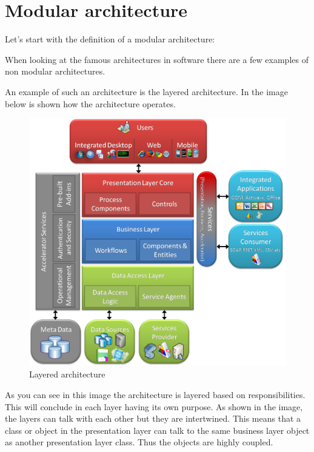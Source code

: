 \chapter{Modular architecture}
\label{sec:ModularArchitecture}

Let's start with the definition of a modular architecture:

When looking at the famous architectures in software there are a few examples of non
modular architectures.

An example of such an architecture is the layered architecture. In the image below is shown how the architecture operates.

\begin{figure}[H]
	\includegraphics[width=\linewidth]{layered_architecture.png}
	\caption{Layered architecture \cite{layeredArchitecture}}
\end{figure}

As you can see in this image the architecture is layered based on responsibilities. This will conclude in each layer having its own purpose. As shown in the image, the layers can talk with each other but they are intertwined. This means that a class or object in the presentation layer can talk to the same business layer object as another presentation layer class. Thus the objects are highly coupled.


